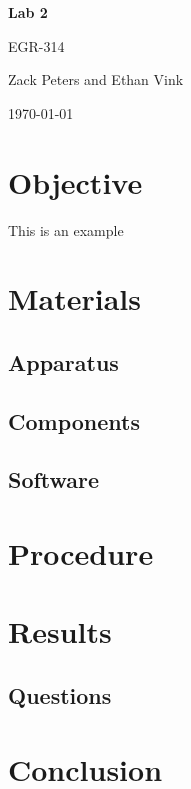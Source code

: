 \documentclass[11pt,a4paper]{article}
\newcommand{\titlestr}{Lab 2}
\newcommand{\authorstr}{Zack Peters and Ethan Vink}
\begin{document}
\begin{titlepage}
  \centering

  \vspace{1cm}
  {\LARGE \bf{\titlestr} \par}
  
  \vspace{.5cm}
  {\LARGE {EGR-314} \par}

  \vspace{1cm}
  {\Large \authorstr \par}

  \vspace{1cm}
  \today    

  \vfill
\end{titlepage}

\newpage

\tableofcontents
\newpage

\section{Objective}
This is an example

\section{Materials}

\subsection{Apparatus}

\subsection{Components}

\subsection{Software}

\section{Procedure}

\section{Results}

\subsection{Questions}

\section{Conclusion}
\end{document}
